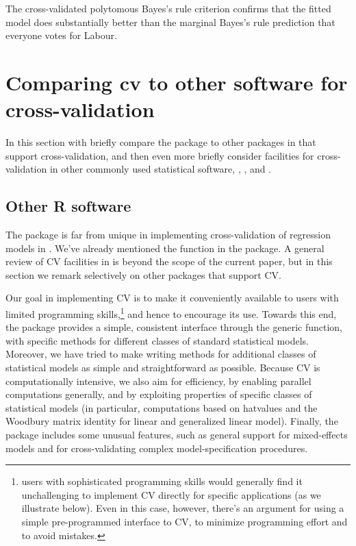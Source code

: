 \documentclass[
]{jss}
\begin{document}
The cross-validated polytomous Bayes's rule criterion confirms that the
fitted model does substantially better than the marginal Bayes's rule
prediction that everyone votes for Labour.

\section{Comparing cv to other software for
cross-validation}\label{comparing-cv-to-other-software-for-cross-validation}

In this section with briefly compare the  package to other
packages in  that support cross-validation, and then even
more briefly consider facilities for cross-validation in other commonly
used statistical software, , , and
.

\subsection{Other R software}\label{other-r-software}

The  package is far from unique in implementing cross-validation
of regression models in . We've already mentioned the
 function in the  package. A general review of
CV facilities in  is beyond the scope of the current paper,
but in this section we remark selectively on other  packages
that support CV.

Our goal in implementing CV is to make it conveniently available to
 users with limited programming skills,\footnote{
  users with sophisticated programming skills would generally find it
  unchallenging to implement CV directly for specific applications (as
  we illustrate below). Even in this case, however, there's an argument
  for using a simple pre-programmed interface to CV, to minimize
  programming effort and to avoid mistakes.} and hence to encourage its
use. Towards this end, the  package provides a simple,
consistent interface through the  generic function, with
specific methods for different classes of standard 
statistical models. Moreover, we have tried to make writing methods for
additional classes of statistical models as simple and straightforward
as possible. Because CV is computationally intensive, we also aim for
efficiency, by enabling parallel computations generally, and by
exploiting properties of specific classes of statistical models (in
particular, computations based on hatvalues and the Woodbury matrix
identity for linear and generalized linear model). Finally, the package
includes some unusual features, such as general support for
mixed-effects models and for cross-validating complex
model-specification procedures.
\end{document}

